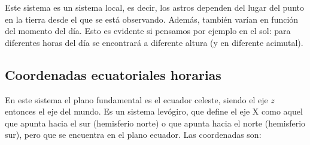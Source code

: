 \newpage

Este sistema es un sistema local, es decir, los astros dependen del lugar del punto en la tierra desde el que se está observando. Además, también varían en función del momento del día. Esto es evidente si pensamos por ejemplo en el sol: para diferentes horas del día se encontrará a diferente altura (y en diferente acimutal). 

\subsection{Coordenadas ecuatoriales horarias}

En este sistema el plano fundamental es el ecuador celeste, siendo el eje $z$ entonces el eje del mundo. Es un sistema levógiro, que define el eje X como aquel que apunta hacia el sur (hemisferio norte) o que apunta hacia el norte (hemisferio sur), pero que se encuentra en el plano ecuador. Las coordenadas son:

